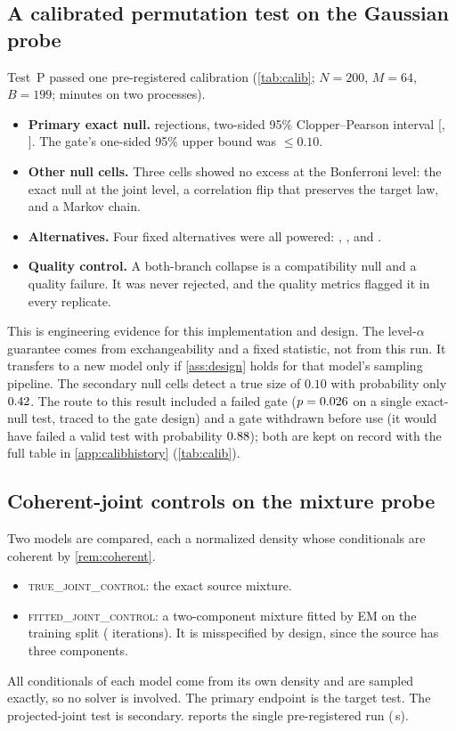 \documentclass{article}
\theoremstyle{plain}
\theoremstyle{definition}
\theoremstyle{remark}
\begin{document}
\subsection{A calibrated permutation test on the Gaussian probe}
\label{sec:exp-calib}
Test~P passed one pre-registered calibration (\cref{tab:calib}; $N=200$, $M=64$, $B=199$; \numCalibWall{} minutes on two processes).
\begin{itemize}
\item \textbf{Primary exact null.} \numCalibPrimK{} rejections, two-sided 95\% Clopper--Pearson interval [\numCalibPrimTwoLo, \numCalibPrimTwoHi]. The gate's one-sided 95\% upper bound was \numCalibPrimHi{} $\le 0.10$.
\item \textbf{Other null cells.} Three cells showed no excess at the Bonferroni level: the exact null at the joint level, a correlation flip that preserves the target law, and a Markov chain.
\item \textbf{Alternatives.} Four fixed alternatives were all powered: \numCalibPowShift, \numCalibPowVar, \numCalibPowCollInt{} and \numCalibPowCorrJ.
\item \textbf{Quality control.} A both-branch collapse is a compatibility null and a quality failure. It was never rejected, and the quality metrics flagged it in every replicate.
\end{itemize}
This is engineering evidence for this implementation and design.
The level-$\alpha$ guarantee comes from exchangeability and a fixed statistic, not from this run. It transfers to a new model only if \cref{ass:design} holds for that model's sampling pipeline.
The secondary null cells detect a true size of $0.10$ with probability only $0.42$.
The route to this result included a failed gate ($p=0.026$ on a single exact-null test, traced to the gate design) and a gate withdrawn before use (it would have failed a valid test with probability $0.88$); both are kept on record with the full table in \cref{app:calibhistory} (\cref{tab:calib}).



\subsection{Coherent-joint controls on the mixture probe}
\label{sec:exp-coherent}
Two models are compared, each a normalized density whose conditionals are coherent by \cref{rem:coherent}.
\begin{itemize}
\item \textsc{true\_joint\_control}: the exact source mixture.
\item \textsc{fitted\_joint\_control}: a two-component mixture fitted by EM on the training split (\numSynEMIter{} iterations). It is misspecified by design, since the source has three components.
\end{itemize}
All conditionals of each model come from its own density and are sampled exactly, so no solver is involved.
The primary endpoint is the target test. The projected-joint test is secondary.
 reports the single pre-registered run (\numSynWall\,s).
\end{document}
